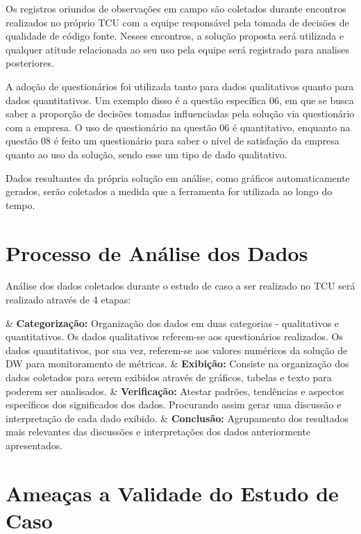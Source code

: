 Os registros oriundos de observações em campo são coletados durante encontros realizados no próprio TCU com a equipe responsável pela tomada de decisões de qualidade de código fonte. Nesses encontros, a solução proposta será utilizada e qualquer atitude relacionada ao seu uso pela equipe será registrado para analises posteriores.

A adoção de questionários foi utilizada tanto para dados qualitativos quanto para dados quantitativos. Um exemplo disso é a questão específica 06, em que se busca saber a proporção de decisões tomadas influenciadas pela solução via questionário com a empresa. O uso de questionário na questão 06 é quantitativo, enquanto na questão 08 é feito um questionário para saber o nível de satisfação da empresa quanto ao uso da solução, sendo esse um tipo de dado qualitativo.

Dados resultantes da própria solução em análise, como gráficos automaticamente gerados, serão coletados a medida que a ferramenta for utilizada ao longo do tempo.

\section{Processo de Análise dos Dados} \label{sec:Análise}

Análise dos dados coletados durante o estudo de caso a ser realizado no TCU será realizado através de 4 etapas:

\begin{easylist}[itemize]	
	
	& \textbf{Categorização: } Organização dos dados em duas categorias - qualitativos e quantitativos. Os 		dados qualitativos referem-se aos questionários realizados. Os dados quantitativos, por sua vez, 			referem-se aos valores numéricos da solução de DW para monitoramento de métricas. 
	& \textbf{Exibição: } Consiste na organização dos dados coletados para serem exibidos através de 				gráficos, tabelas e texto para poderem ser analisados. 
	& \textbf{Verificação: } Atestar padrões, tendências e aspectos específicos dos significados dos 				dados. Procurando assim gerar uma discussão e interpretação de cada dado exibido.
	& \textbf{Conclusão: } Agrupamento dos resultados mais relevantes das discussões e interpretações dos 			dados anteriormente apresentados.
	
	\end{easylist}

\section{Ameaças a Validade do Estudo de Caso} \label{sec:Validade}

